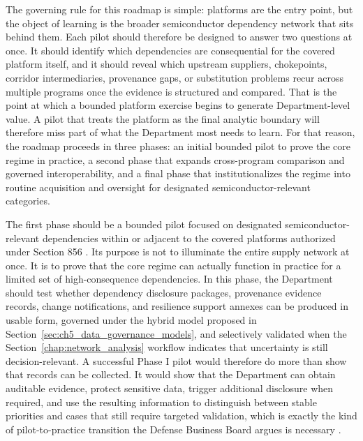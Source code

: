 The governing rule for this roadmap is simple: platforms are the entry point, but the object of learning is the broader semiconductor dependency network that sits behind them. Each pilot should therefore be designed to answer two questions at once. It should identify which dependencies are consequential for the covered platform itself, and it should reveal which upstream suppliers, chokepoints, corridor intermediaries, provenance gaps, or substitution problems recur across multiple programs once the evidence is structured and compared. That is the point at which a bounded platform exercise begins to generate Department-level value. A pilot that treats the platform as the final analytic boundary will therefore miss part of what the Department most needs to learn. For that reason, the roadmap proceeds in three phases: an initial bounded pilot to prove the core regime in practice, a second phase that expands cross-program comparison and governed interoperability, and a final phase that institutionalizes the regime into routine acquisition and oversight for designated semiconductor-relevant categories.

The first phase should be a bounded pilot focused on designated semiconductor-relevant dependencies within or adjacent to the covered platforms authorized under Section 856 \parencite{ch5_ndaa2024_sec856}. Its purpose is not to illuminate the entire supply network at once. It is to prove that the core regime can actually function in practice for a limited set of high-consequence dependencies. In this phase, the Department should test whether dependency disclosure packages, provenance evidence records, change notifications, and resilience support annexes can be produced in usable form, governed under the hybrid model proposed in Section~\ref{sec:ch5_data_governance_models}, and selectively validated when the Section~\ref{chap:network_analysis} workflow indicates that uncertainty is still decision-relevant. A successful Phase I pilot would therefore do more than show that records can be collected. It would show that the Department can obtain auditable evidence, protect sensitive data, trigger additional disclosure when required, and use the resulting information to distinguish between stable priorities and cases that still require targeted validation, which is exactly the kind of pilot-to-practice transition the Defense Business Board argues is necessary \parencite{ch5_dbb2025_illumination}.

